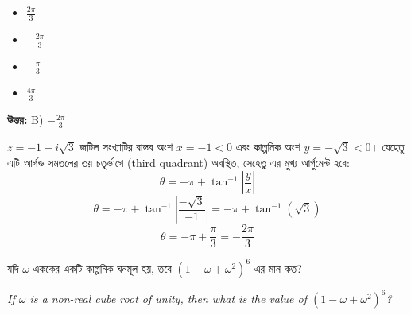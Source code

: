 \documentclass[12pt, a4paper]{article}
\begin{document}
\begin{itemize}[label={}, leftmargin=1cm, itemsep=0.5em]
    \item[\textbf{A)}] $\frac{2\pi}{3}$
    \item[\textbf{B)}] $-\frac{2\pi}{3}$
    \item[\textbf{C)}] $-\frac{\pi}{3}$
    \item[\textbf{D)}] $\frac{4\pi}{3}$
\end{itemize}

\vspace{0.5em}
\begin{tcolorbox}[answerbox]
    \textbf{\color{success} উত্তর:} B) $-\frac{2\pi}{3}$
\end{tcolorbox}
\vspace{1em}

\begin{tcolorbox}[solutionbox={সমাধান (Solution)}]
    \noindent
    $z = -1 - i\sqrt{3}$ জটিল সংখ্যাটির বাস্তব অংশ $x = -1 < 0$ এবং কাল্পনিক অংশ $y = -\sqrt{3} < 0$। যেহেতু এটি আর্গন্ড সমতলের ৩য় চতুর্ভাগে (third quadrant) অবস্থিত, সেহেতু এর মুখ্য আর্গুমেন্ট হবে:
    \[ \theta = -\pi + \tan^{-1}\left|\frac{y}{x}\right| \]
    \[ \theta = -\pi + \tan^{-1}\left|\frac{-\sqrt{3}}{-1}\right| = -\pi + \tan^{-1}(\sqrt{3}) \]
    \[ \theta = -\pi + \frac{\pi}{3} = -\frac{2\pi}{3} \]
\end{tcolorbox}

\vspace{1.5em}

\begin{tcolorbox}[questionbox={প্রশ্ন (Question) 23}]
    \noindent
    যদি $\omega$ এককের একটি কাল্পনিক ঘনমূল হয়, তবে $(1 - \omega + \omega^2)^6$ এর মান কত?
    
    \vspace{0.8em}
    \begin{english}
    \noindent\textit{\color{darkgray}
    If $\omega$ is a non-real cube root of unity, then what is the value of $(1 - \omega + \omega^2)^6$?
    }
    \end{english}
\end{tcolorbox}
\end{document}

